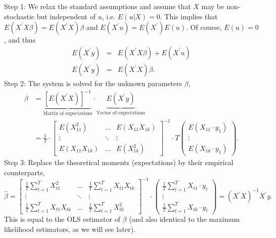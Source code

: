 \begin{Solution}{11.7}
Step 1: We relax the standard assumptions and assume that $X$ may be
non-stochastic but independent of $u$, i.e. $E(u|X)=0$. This implies that
$E\left( X^{\prime }X\beta \right) =E\left( X^{\prime }X\right) \beta $ and
$E\left( X^{\prime
}u\right) =E\left( X^{\prime }\right) E(u)$. Of course, $E(u)=0$, and thus%
\begin{eqnarray*}
E\left( X^{\prime }y\right)  &=&E\left( X^{\prime }X\beta \right) +E\left(
X^{\prime }u\right)  \\
E\left( X^{\prime }y\right)  &=&E\left( X^{\prime }X\right) \beta .
\end{eqnarray*}%
Step 2: The system is solved for the unknown parameters $\beta $,%
\begin{align*}
\beta &= \underbrace{\left[E\left( X^{\prime }X\right)\right]^{-1}}_{\text{Matrix of expectations}} \cdot \underbrace{E\left( X^{\prime}y\right)}_\text{Vector of expectations}\\
&= \frac{1}{T}\cdot \begin{bmatrix}
                    E(X_{11}^2) & \dots & E(X_{11}X_{1k})\\
                    \vdots & \ddots &\vdots\\
                    E(X_{11}X_{1k}) & \dots & E(X_{1k}^2)
                  \end{bmatrix}^{-1}
\cdot T
\begin{pmatrix}
    E(X_{11}\cdot y_1)\\
    \vdots\\
    E(X_{1k}\cdot y_1)
\end{pmatrix}.
\end{align*}%
Step 3: Replace the theoretical moments (expectations) by their empirical
counterparts,%
\begin{equation*}
\hat{\beta}=
\begin{bmatrix}
    \frac{1}{T}\sum_{t=1}^T X_{t1}^2 & \dots & \frac{1}{T}\sum_{t=1}^T X_{t1}X_{tk}\\
    \vdots & \ddots &\vdots\\
    \frac{1}{T}\sum_{t=1}^T X_{t1}X_{tk} & \dots & \frac{1}{T}\sum_{t=1}^T X_{tk}^2
\end{bmatrix}^{-1}
\cdot
\begin{pmatrix}
    \frac{1}{T}\sum_{t=1}^T X_{t1}\cdot y_t\\
    \vdots\\
    \frac{1}{T}\sum_{t=1}^T X_{tk}\cdot y_t
\end{pmatrix}=(X^{\prime }X)^{-1}X^{\prime }y.
\end{equation*}%
This is equal to the OLS estimator of $\beta $ (and also identical to the
maximum likelihood estimators, as we will see later).
\end{Solution}
